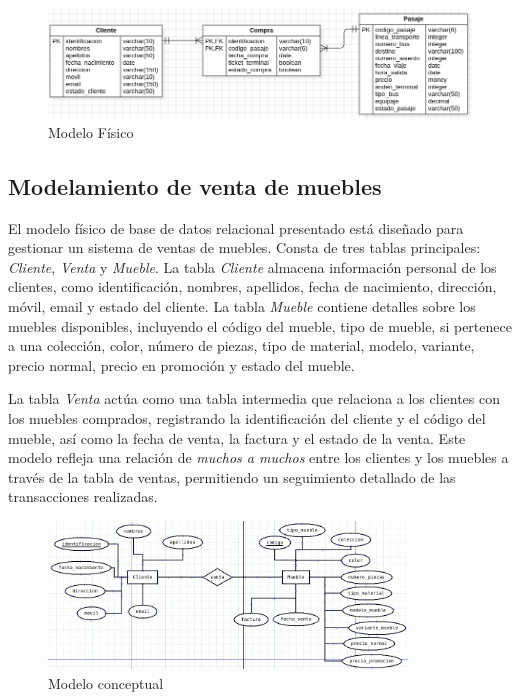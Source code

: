 \documentclass[12pt]{article}
\begin{document}
                        \begin{figure}[!h]
                                \centering
                                \includegraphics[width=1\textwidth]{img/ej2-3.png}
                                \caption{Modelo Físico}
                        \end{figure}
                        
                        
                \newpage
                \subsection{Modelamiento de venta de muebles}
                        El modelo físico de base de datos relacional presentado está diseñado para gestionar un sistema de ventas de muebles. Consta de tres tablas principales: \textit{Cliente}, \textit{Venta} y \textit{Mueble}. La tabla \textit{Cliente} almacena información personal de los clientes, como identificación, nombres, apellidos, fecha de nacimiento, dirección, móvil, email y estado del cliente. La tabla \textit{Mueble} contiene detalles sobre los muebles disponibles, incluyendo el código del mueble, tipo de mueble, si pertenece a una colección, color, número de piezas, tipo de material, modelo, variante, precio normal, precio en promoción y estado del mueble. 
                        
                        La tabla \textit{Venta} actúa como una tabla intermedia que relaciona a los clientes con los muebles comprados, registrando la identificación del cliente y el código del mueble, así como la fecha de venta, la factura y el estado de la venta. Este modelo refleja una relación de \textit{muchos a muchos} entre los clientes y los muebles a través de la tabla de ventas, permitiendo un seguimiento detallado de las transacciones realizadas.

                        \begin{figure}[!h]
                                \centering
                                \includegraphics[width=0.85\textwidth]{img/ej3-1.png}
                                \caption{Modelo conceptual}
                        \end{figure}
\end{document}
